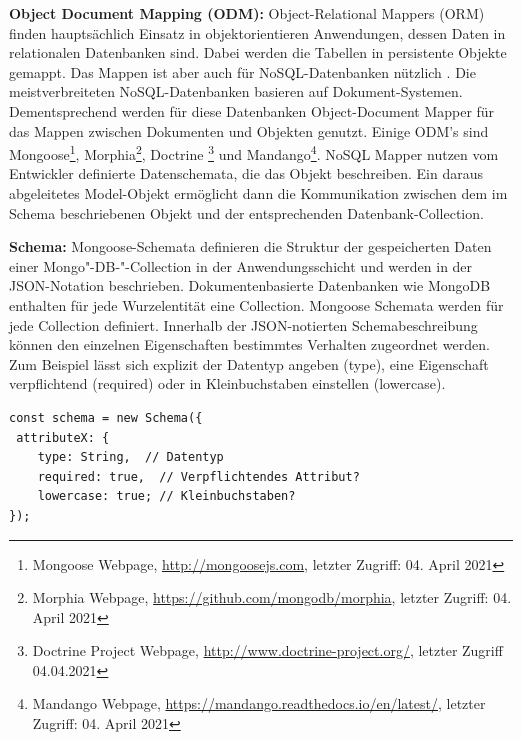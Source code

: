 %
%
%

\noindent
\textbf{Object Document Mapping (ODM):}
Object-Relational Mappers (ORM) finden haupt\-sächlich Einsatz in objektorientieren Anwendungen, dessen Daten in relationalen Datenbanken sind. Dabei werden die Tabellen in persistente Objekte gemappt.
Das Mappen ist aber auch für NoSQL-Datenbanken nützlich \cite{Node2.56}. Die meistverbreiteten NoSQL-Datenbanken basieren auf Dokument-Systemen. Dementsprechend werden für diese Datenbanken Object-Document Mapper für das Mappen zwischen Dokumenten und Objekten genutzt. Einige ODM’s sind Mongoose\footnote{Mongoose Webpage, \url{http://mongoosejs.com}, letzter Zugriff: 04. April 2021}, Morphia\footnote{Morphia Webpage, \url{https://github.com/mongodb/morphia}, letzter Zugriff: 04. April 2021}, Doctrine \footnote{Doctrine Project Webpage, \url{http://www.doctrine-project.org/}, letzter Zugriff 04.04.2021} und Mandango\footnote{Mandango Webpage, \url{https://mandango.readthedocs.io/en/latest/}, letzter Zugriff: 04. April 2021}.
NoSQL Mapper nutzen vom Entwickler definierte Datenschemata, die das Objekt beschreiben. Ein daraus abgeleitetes Model-Objekt ermöglicht dann die Kommunikation zwischen dem im Schema beschriebenen Objekt und der entsprechenden Datenbank-Collection.
\newline

%
%
%

\noindent
\textbf{Schema:}
Mongoose-Schemata definieren die Struktur der gespeicherten Daten einer Mongo"-DB-"-Collection in der Anwendungsschicht und werden in der JSON-Notation beschrieben. Dokumentenbasierte Datenbanken wie MongoDB enthalten für jede Wurzelentität eine Collection. Mongoose Schemata werden für jede Collection definiert. Innerhalb der JSON-notierten Schemabeschreibung können den einzelnen Eigenschaften bestimmtes Verhalten zugeordnet werden. Zum Beispiel lässt sich explizit der Datentyp angeben (type), eine Eigenschaft verpflichtend (required) oder in Kleinbuchstaben einstellen (lowercase).
\newline


\begin{lstlisting}[caption=Mongoose Schema - Beispiel,label=lst:MongooseSchema]
const schema = new Schema({
 attributeX: {
 	type: String,  // Datentyp
 	required: true,  // Verpflichtendes Attribut?
 	lowercase: true; // Kleinbuchstaben?
});
\end{lstlisting}

%
%
%

